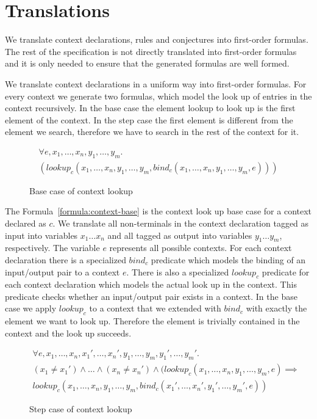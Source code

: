 \section{Translations}
\label{sec:translations}
We translate context declarations, rules and conjectures into
first-order formulas. The rest of the specification is not directly
translated into first-order formulas and it is only needed to ensure
that the generated formulas are well formed.


We translate context declarations in a uniform way into first-order
formulas. For every context we generate two formulas, which model the
look up of entries in the context recursively. In the base case the
element lookup to look up is the first element of the context. In the
step case the first element is different from the element we search,
therefore we have to search in the rest of the context for it.

\begin{figure}
\begin{multline}
  \forall e, x_1, \dots, x_n, y_1, \dots, y_m . \\
  (lookup_c(x_1,\dots,x_n,y_1,\dots,y_m,
  bind_c(x_1,\dots,x_n,y_1,\dots,y_m,e)))
\label{formula:context-base}
\end{multline}
\caption{Base case of context lookup}
\end{figure}

The Formula~\ref{formula:context-base} is the context look up base
case for a context declared as $c$. We translate all non-terminals in
the context declaration tagged as input into variables $x_1 \dots x_n$
and all tagged as output into variables $y_1 \dots y_m$,
respectively. The variable $e$ represents all possible contexts. For
each context declaration there is a specialized $bind_c$ predicate
which models the binding of an input/output pair to a context
$e$. There is also a specialized $lookup_c$ predicate for each context
declaration which models the actual look up in the context. This
predicate checks whether an input/output pair exists in a context. In
the base case we apply $lookup_c$ to a context that we extended with
$bind_c$ with exactly the element we want to look up. Therefore the
element is trivially contained in the context and the look up
succeeds.

\begin{figure}
\begin{multline}
  \forall e, x_1, \dots, x_n, x_1', \dots, x_n', y_1, \dots, y_m,
  y_1', \dots,
  y_m' . \\
  (x_1 \neq x_1') \land \dots \land (x_n \neq x_n') \land (lookup_c(x_1,
  \dots, x_n, y_1, \dots, y_m, e) \implies \\ lookup_c(x_1, \dots, x_n,
  y_1, \dots, y_m, bind_c(x_1',\dots,x_n',y_1',\dots,y_m',e))
\label{formula:context-step}
\end{multline}
\caption{Step case of context lookup}
\end{figure}

